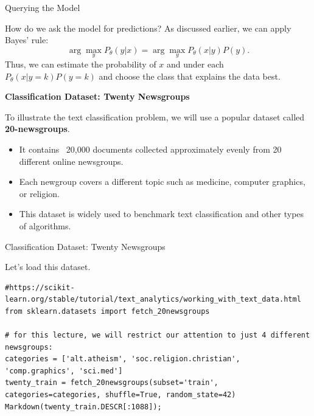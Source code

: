 \documentclass[../../main.tex]{subfiles}
\begin{document}
\begin{frame}[fragile]{Querying the Model}



How do we ask the model for predictions? As discussed earlier, we can apply Bayes' rule:
$$\arg\max_y P_\theta(y|x) = \arg\max_y P_\theta(x|y)P(y).$$
Thus, we can estimate the probability of $x$ and under each $P_\theta(x|y=k)P(y=k)$ and choose the class that explains the data best.

\vspace{0.2cm}

\textbf{Classification Dataset: Twenty Newsgroups}

To illustrate the text classification problem, we will use a popular dataset called \textbf{20-newsgroups}. 


\begin{itemize}
    \item It contains ~20,000 documents collected approximately evenly from 20 different online newsgroups.
    \item Each newgroup covers a different topic such as medicine, computer graphics, or religion.
    \item This dataset is widely used to benchmark text classification and other types of algorithms.
\end{itemize}

\end{frame}

\begin{frame}[fragile]{Classification Dataset: Twenty Newsgroups}

Let's load this dataset.


\begin{lstlisting}
#https://scikit-learn.org/stable/tutorial/text_analytics/working_with_text_data.html
from sklearn.datasets import fetch_20newsgroups

# for this lecture, we will restrict our attention to just 4 different newsgroups:
categories = ['alt.atheism', 'soc.religion.christian', 'comp.graphics', 'sci.med']
twenty_train = fetch_20newsgroups(subset='train', categories=categories, shuffle=True, random_state=42)
Markdown(twenty_train.DESCR[:1088]);
\end{lstlisting}
\end{frame}
\end{document}
